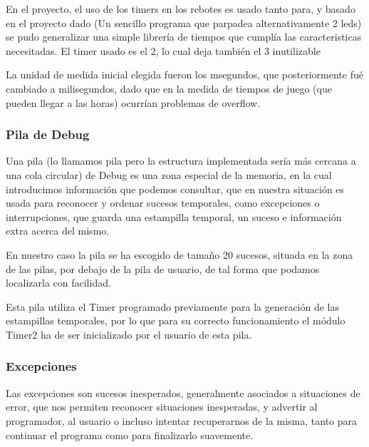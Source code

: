 \documentclass[12pt,letterpaper]{article}
\begin{document}
En el proyecto, el uso de los timers en los rebotes es usado tanto
para, y basado en el proyecto dado (Un sencillo programa que parpadea
alternativamente 2 leds) se pudo generalizar una simple librería de
tiempos que cumplía las caracteristicas necesitadas. El timer usado es
el 2, lo cual deja también el 3 inutilizable

La unidad de medida inicial elegida fueron los \textgreek{m}segundos,
que posteriormente fué cambiado a milisegundos, dado que en la medida
de tiempos de juego (que pueden llegar a las horas) ocurrían problemas
de overflow.

\subsubsection{Pila de Debug}
\label{subsubsec:piladebug}
Una pila (lo llamamos pila pero la estructura implementada sería más
cercana a una cola circular) de Debug es una zona especial de la
memoria, en la cual introducimos información que podemos consultar,
que en nuestra situación es usada para reconocer y ordenar sucesos
temporales, como excepciones o interrupciones, que guarda una
estampilla temporal, un suceso e información extra acerca del mismo.

En nuestro caso la pila se ha escogido de tamaño 20 sucesos, situada
en la zona de las pilas, por debajo de la pila de usuario, de tal
forma que podamos localizarla con facilidad.

Esta pila utiliza el Timer programado previamente para la generación
de las estampillas temporales, por lo que para su correcto
funcionamiento el módulo Timer2 ha de ser inicializado por el usuario
de esta pila.

\subsubsection{Excepciones}
\label{subsubsec:excepciones}
Las excepciones son sucesos inesperados, generalmente asociados a
situaciones de error, que nos permiten reconocer situaciones
inesperadas, y advertir al programador, al usuario o incluso intentar
recuperarnos de la misma, tanto para continuar el programa como para
finalizarlo suavemente.
\end{document}
